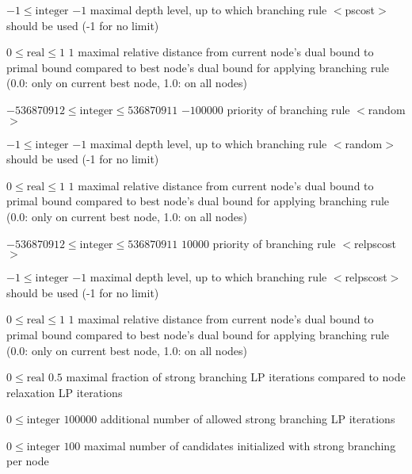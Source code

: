 %
{$-1\leq\textrm{integer}$}%
{$-1$}%
{maximal depth level, up to which branching rule $<$pscost$>$ should be used (-1 for no limit)}%
{}

%
{$0\leq\textrm{real}\leq1$}%
{$1$}%
{maximal relative distance from current node's dual bound to primal bound compared to best node's dual bound for applying branching rule (0.0: only on current best node, 1.0: on all nodes)}%
{}

%
{$-536870912\leq\textrm{integer}\leq536870911$}%
{$-100000$}%
{priority of branching rule $<$random$>$}%
{}

%
{$-1\leq\textrm{integer}$}%
{$-1$}%
{maximal depth level, up to which branching rule $<$random$>$ should be used (-1 for no limit)}%
{}

%
{$0\leq\textrm{real}\leq1$}%
{$1$}%
{maximal relative distance from current node's dual bound to primal bound compared to best node's dual bound for applying branching rule (0.0: only on current best node, 1.0: on all nodes)}%
{}

%
{$-536870912\leq\textrm{integer}\leq536870911$}%
{$10000$}%
{priority of branching rule $<$relpscost$>$}%
{}

%
{$-1\leq\textrm{integer}$}%
{$-1$}%
{maximal depth level, up to which branching rule $<$relpscost$>$ should be used (-1 for no limit)}%
{}

%
{$0\leq\textrm{real}\leq1$}%
{$1$}%
{maximal relative distance from current node's dual bound to primal bound compared to best node's dual bound for applying branching rule (0.0: only on current best node, 1.0: on all nodes)}%
{}

%
{$0\leq\textrm{real}$}%
{$0.5$}%
{maximal fraction of strong branching LP iterations compared to node relaxation LP iterations}%
{}

%
{$0\leq\textrm{integer}$}%
{$100000$}%
{additional number of allowed strong branching LP iterations}%
{}

%
{$0\leq\textrm{integer}$}%
{$100$}%
{maximal number of candidates initialized with strong branching per node}%
{}


